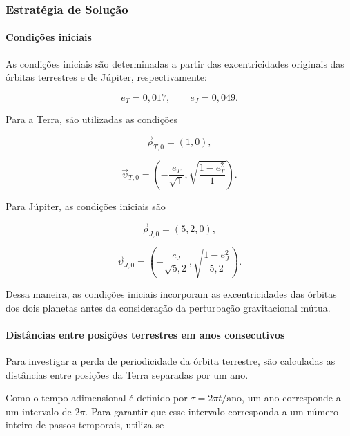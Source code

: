 \documentclass[12pt,a4paper]{article}
\begin{document}
\subsubsection{Estratégia de Solução}

\paragraph{Condições iniciais}

As condições iniciais são determinadas a partir das excentricidades originais das órbitas terrestres e de Júpiter, respectivamente:

\begin{equation}
    e_T=0,017,
    \qquad
    e_J=0,049.
\end{equation}

Para a Terra, são utilizadas as condições

\begin{equation}
    \vec{\rho}_{T,0}=(1,0),
\end{equation}

\begin{equation}
    \vec{\upsilon}_{T,0}
    =
    \left(
    -\frac{e_T}{\sqrt{1}},
    \sqrt{\frac{1-e_T^2}{1}}
    \right).
\end{equation}

Para Júpiter, as condições iniciais são

\begin{equation}
    \vec{\rho}_{J,0}=(5,2,0),
\end{equation}

\begin{equation}
    \vec{\upsilon}_{J,0}
    =
    \left(
    -\frac{e_J}{\sqrt{5,2}},
    \sqrt{\frac{1-e_J^2}{5,2}}
    \right).
\end{equation}

Dessa maneira, as condições iniciais incorporam as excentricidades das órbitas dos dois planetas antes da consideração da perturbação gravitacional mútua.

\paragraph{Distâncias entre posições terrestres em anos consecutivos}

Para investigar a perda de periodicidade da órbita terrestre, são calculadas as distâncias entre posições da Terra separadas por um ano.

Como o tempo adimensional é definido por $\tau=2\pi t/\mathrm{ano}$, um ano corresponde a um intervalo de $2\pi$. Para garantir que esse intervalo corresponda a um número inteiro de passos temporais, utiliza-se
\end{document}
